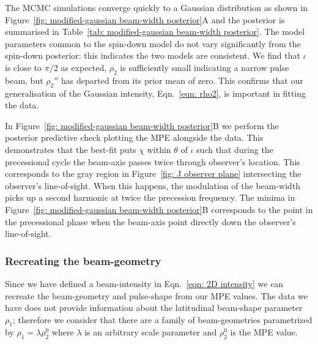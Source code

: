 \documentclass[../full_thesis/full_thesis.tex]{subfiles}
\newcommand{\thisdir}{../comparing_periodic_modulations}
\newcommand{\bigfigurecaptions}[2]{
$\textbf{A}$: The estimated marginal posterior probability distribution for the
#1 #2 model parameters. $\textbf{B}$: Checking the fit of the model using the
maximum posterior values to the data; see Figure~\ref{fig: noise-only beam-width
posterior fit} for a complete description.}
\begin{document}
The MCMC simulations converge quickly to a Gaussian distribution as shown in
Figure~\ref{fig: modified-gaussian beam-width posterior}A and the posterior is
summarised in Table~\ref{tab: modified-gaussian beam-width posterior}. The model parameters
common to the spin-down model do not vary significantly from the spin-down
posterior: this indicates the two models are consistent. We find that $\iota$
is close to $\pi/2$ as expected, $\rho_2$ is sufficiently small indicating a
narrow pulse beam, but $\rho_2''$ has departed from its prior mean of zero.
This confirms that our generalisation of the Gaussian intensity,
Eqn.~\eqref{eqn: rho2}, is important in fitting the data.
\begin{figure*}
\centering
\texttt{[image: \{Beamwidth\_ModifiedGaussian\_0.1\_PosteriorWithFit]}.pdf}
\caption{\bigfigurecaptions{modified-Gaussian precession}{beam-width}}
\label{fig: modified-gaussian beam-width posterior}
\end{figure*}
\begin{table}[htb]
\small
\centering
\caption{Posterior estimates for the beam-width modified-Gaussian precession model.}
\label{tab: modified-gaussian beam-width posterior}

\end{table}

In Figure~\ref{fig: modified-gaussian beam-width posterior}B we perform the
posterior predictive check plotting the MPE alongside the data.  This
demonstrates that the best-fit puts $\chi$ within $\theta$ of $\iota$ such that
during the precessional cycle the beam-axis passes twice through observer's
location. This corresponds to the gray region in Figure~\ref{fig: J observer
plane} intersecting the observer's line-of-sight. When this happens, the
modulation of the beam-width picks up a second harmonic at twice the precession
frequency. The minima in Figure~\ref{fig: modified-gaussian beam-width
posterior}B corresponds to the point in the precessional phase when the
beam-axis point directly down the observer's line-of-sight.



\subsubsection{Recreating the beam-geometry}
\label{sec: recreating the beam-geometry}

Since we have defined a beam-intensity in Eqn.~\eqref{eqn: 2D intensity} we can
recreate the beam-geometry and pulse-shape from our MPE values.  The data we
have does not provide information about the latitudinal beam-shape parameter
$\rho_1$; therefore we consider that there are a family of beam-geometries
parametrized by $\rho_1 = \lambda \rho_2^0$ where $\lambda$ is an arbitrary
scale parameter and $\rho_2^0$ is the MPE value.
\end{document}
